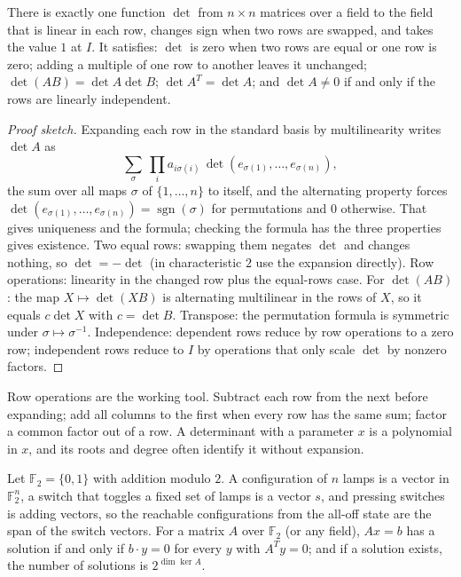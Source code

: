 \begin{theorem}
There is exactly one function $\det$ from $n\times n$ matrices over a field to the field that is linear in each row, changes sign when two rows are swapped, and takes the value $1$ at $I$. It satisfies: $\det$ is zero when two rows are equal or one row is zero; adding a multiple of one row to another leaves it unchanged; $\det(AB)=\det A\det B$; $\det A^{T}=\det A$; and $\det A\ne 0$ if and only if the rows are linearly independent.
\end{theorem}

\begin{proof}[Proof sketch]
Expanding each row in the standard basis by multilinearity writes $\det A$ as
\[
\sum_{\sigma}\ \prod_ia_{i\sigma(i)}\,\det(e_{\sigma(1)},\dots,e_{\sigma(n)}),
\]
the sum over all maps $\sigma$ of $\{1,\dots,n\}$ to itself, and the alternating property forces $\det(e_{\sigma(1)},\dots,e_{\sigma(n)})=\operatorname{sgn}(\sigma)$ for permutations and $0$ otherwise. That gives uniqueness and the formula; checking the formula has the three properties gives existence. Two equal rows: swapping them negates $\det$ and changes nothing, so $\det=-\det$ (in characteristic $2$ use the expansion directly). Row operations: linearity in the changed row plus the equal-rows case. For $\det(AB)$: the map $X\mapsto\det(XB)$ is alternating multilinear in the rows of $X$, so it equals $c\det X$ with $c=\det B$. Transpose: the permutation formula is symmetric under $\sigma\mapsto\sigma^{-1}$. Independence: dependent rows reduce by row operations to a zero row; independent rows reduce to $I$ by operations that only scale $\det$ by nonzero factors.
\end{proof}

Row operations are the working tool. Subtract each row from the next before expanding; add all columns to the first when every row has the same sum; factor a common factor out of a row. A determinant with a parameter $x$ is a polynomial in $x$, and its roots and degree often identify it without expansion.

\begin{proposition}
Let $\mathbb F_2=\{0,1\}$ with addition modulo $2$. A configuration of $n$ lamps is a vector in $\mathbb F_2^n$, a switch that toggles a fixed set of lamps is a vector $s$, and pressing switches is adding vectors, so the reachable configurations from the all-off state are the span of the switch vectors. For a matrix $A$ over $\mathbb F_2$ (or any field), $Ax=b$ has a solution if and only if $b\cdot y=0$ for every $y$ with $A^{T}y=0$; and if a solution exists, the number of solutions is $2^{\dim\ker A}$.
\end{proposition}

